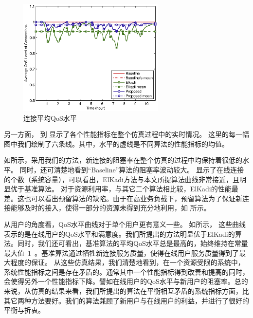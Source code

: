 % 
\begin{figure}[htbp]
\centering
\includegraphics[width=0.65\textwidth] {cacop_avg_qos.eps}
\caption{连接平均QoS水平}\label{fig:chap_cacop:clock_avg_call_qos}
\end{figure}



另一方面， 到  显示了各个性能指标在整个仿真过程中的实时情况。
这里的每一幅图中我们绘制了六条线。其中，水平的虚线是不同算法的性能指标的均值。

如所示，采用我们的方法，新连接的阻塞率在整个仿真的过程中均保持着很低的水平。
同时，还可清楚地看到“Baseline”算法的阻塞率波动较大。
 显示了在线连接的个数（系统容量），可以看出，ElKadi方法与本文所提算法曲线非常接近，且明显优于基准算法。
对于资源利用率，与其它二个算法相比较，ElKadi的性能最差。这也可以看出预留算法的缺陷。由于在高业务负载下，预留算法为了保证新连接能够及时的接入，使得一部分的资源未得到充分地利用，如 所示。
 
从用户的角度看，QoS水平曲线对于单个用户更有意义一些。
如所示，
这些曲线表示的是在线用户的QoS水平和满意度。我们所提出的方法明显优于ElKadi的算法。同时，我们还可看出，基准算法的平均QoS水平总是最高的，始终维持在常量最大值~$1$~。基准算法通过牺牲新连接服务质量，使得在线用户服务质量得到了最大程度的保证。
从这些仿真结果，我们清楚地看到，在一个资源受限的系统中，系统性能指标之间是存在矛盾的。通常其中一个性能指标得到改善和提高的同时，会使得另外一个性能指标下降。譬如在线用户的QoS水平与新用户的阻塞率。总的来说，从仿真的结果来看，我们所提出的算法在平衡相互矛盾的系统指标方面，比其它两种方法要好。我们的算法兼顾了新用户与在线用户的利益，并进行了很好的平衡与折衷。


